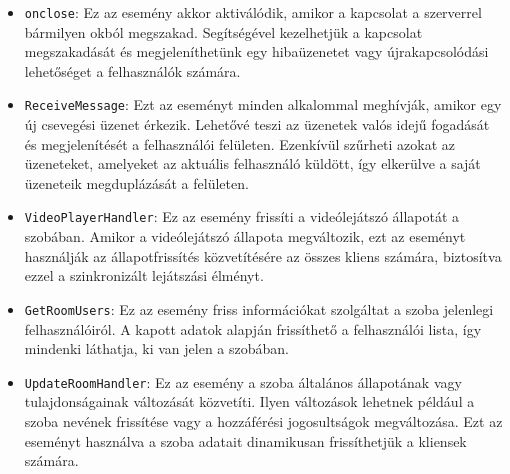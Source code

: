 \vspace{1em}
\begin{itemize}
  \item \texttt{onclose}: Ez az esemény akkor aktiválódik, amikor a kapcsolat a szerverrel bármilyen okból megszakad. Segítségével kezelhetjük a kapcsolat megszakadását és megjeleníthetünk egy hibaüzenetet vagy újrakapcsolódási lehetőséget a felhasználók számára.
  \item \texttt{ReceiveMessage}: Ezt az eseményt minden alkalommal meghívják, amikor egy új csevegési üzenet érkezik. Lehetővé teszi az üzenetek valós idejű fogadását és megjelenítését a felhasználói felületen. Ezenkívül szűrheti azokat az üzeneteket, amelyeket az aktuális felhasználó küldött, így elkerülve a saját üzeneteik megduplázását a felületen.
  \item \texttt{VideoPlayerHandler}: Ez az esemény frissíti a videólejátszó állapotát a szobában. Amikor a videólejátszó állapota megváltozik, ezt az eseményt használják az állapotfrissítés közvetítésére az összes kliens számára, biztosítva ezzel a szinkronizált lejátszási élményt.
  \item \texttt{GetRoomUsers}: Ez az esemény friss információkat szolgáltat a szoba jelenlegi felhasználóiról. A kapott adatok alapján frissíthető a felhasználói lista, így mindenki láthatja, ki van jelen a szobában.
  \item \texttt{UpdateRoomHandler}: Ez az esemény a szoba általános állapotának vagy tulajdonságainak változását közvetíti. Ilyen változások lehetnek például a szoba nevének frissítése vagy a hozzáférési jogosultságok megváltozása. Ezt az eseményt használva a szoba adatait dinamikusan frissíthetjük a kliensek számára.
\end{itemize}
